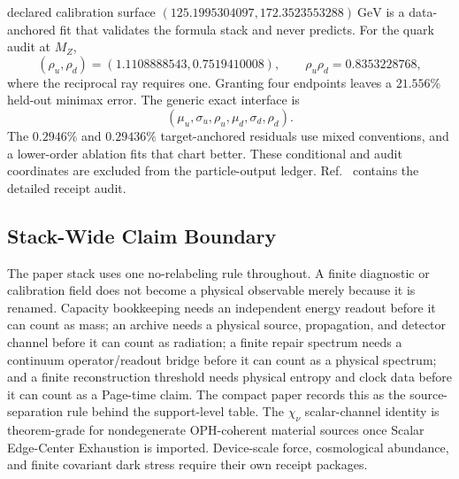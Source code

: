 \documentclass[11pt]{article}
\begin{document}
declared calibration surface \((125.1995304097,172.3523553288)~\mathrm{GeV}\)
is a data-anchored fit that validates the formula stack and never predicts.
For the quark audit at \(M_Z\),
\[
(\rho_u,\rho_d)=(1.1108888543,0.7519410008),
\qquad \rho_u\rho_d=0.8353228768,
\]
where the reciprocal ray requires one. Granting four endpoints leaves a
\(21.556\%\) held-out minimax error. The generic exact interface is
\[
(\mu_u,\sigma_u,\rho_u,\mu_d,\sigma_d,\rho_d).
\]
The
\(0.2946\%\) and \(0.29436\%\) target-anchored residuals use mixed conventions,
and a lower-order ablation fits that chart better. These conditional and audit
coordinates are excluded from the particle-output ledger. Ref.~\cite{ophparticles}
contains the detailed receipt audit.

\subsection*{Stack-Wide Claim Boundary}

The paper stack uses one no-relabeling rule throughout. A finite diagnostic or
calibration field does not become a physical observable merely because it is
renamed. Capacity bookkeeping needs an independent energy readout before it can
count as mass; an archive needs a physical source, propagation, and detector
channel before it can count as radiation; a finite repair spectrum needs a
continuum operator/readout bridge before it can count as a physical spectrum;
and a finite reconstruction threshold needs physical entropy and clock data
before it can count as a Page-time claim. The compact paper records this as the
source-separation rule behind the support-level table.
The \(\chi_\nu\) scalar-channel identity is theorem-grade for nondegenerate
OPH-coherent material sources once Scalar Edge-Center Exhaustion is imported.
Device-scale force, cosmological abundance, and finite covariant dark stress
require their own receipt packages.
\end{document}
